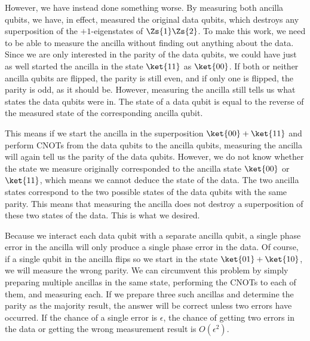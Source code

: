However, we have instead done something worse.  By measuring both
ancilla qubits, we have, in effect, measured the original data qubits, which
destroys any superposition of the $+1$-eigenstates of $\Zs{1} \Zs{2}$.  To make
this work, we need to be able to measure the ancilla without finding out
anything about the data.  Since we are only interested in the parity of the
data qubits, we could have just as well started the ancilla in the state
$\ket{11}$ as $\ket{00}$.  If both or neither ancilla qubits are flipped, the
parity is still even, and if only one is flipped, the parity is odd, as it
should be.  However, measuring the ancilla still tells us what states the data
qubits were in.  The state of a data qubit is equal to the reverse of the
measured state of the corresponding ancilla qubit.

This means if we start the ancilla in the superposition $\ket{00} +
\ket{11}$ and perform CNOTs from the data qubits to the ancilla qubits,
measuring the ancilla will again tell us the parity of the data qubits.
However, we do not know whether the state we measure originally
corresponded to the ancilla state $\ket{00}$ or $\ket{11}$, which means
we cannot deduce the state of the data.  The two ancilla states correspond
to the two possible states of the data qubits with the same parity.  This
means that measuring the ancilla does not destroy a superposition of these
two states of the data.  This is what we desired.

Because we interact each data qubit with a separate ancilla qubit, a single
phase error in the ancilla will only produce a single phase error in the
data.  Of course, if a single qubit in the ancilla flips so we start in the
state $\ket{01} + \ket{10}$, we will measure the wrong parity.  We can
circumvent this problem by simply preparing multiple ancillas in the same
state, performing the CNOTs to each of them, and measuring each.  If we
prepare three such ancillas and determine the parity as the majority
result, the answer will be correct unless two errors have occurred.  If the
chance of a single error is $\epsilon$, the chance of getting two errors in
the data or getting the wrong measurement result is $O(\epsilon^2)$.

